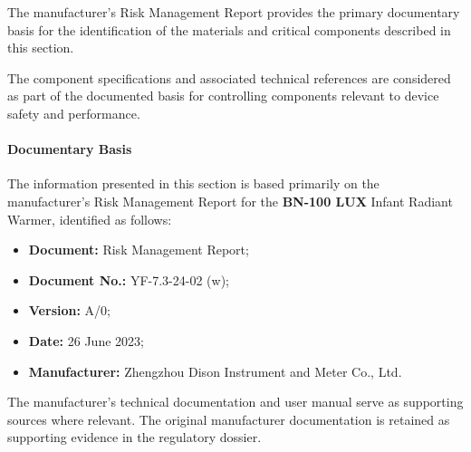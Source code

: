 The manufacturer's Risk Management Report provides the primary
documentary basis for the identification of the materials and
critical components described in this section.

The component specifications and associated technical references
are considered as part of the documented basis for controlling
components relevant to device safety and performance.

\paragraph{Documentary Basis}

The information presented in this section is based primarily on the
manufacturer's Risk Management Report for the
\textbf{BN-100 LUX} Infant Radiant Warmer, identified as follows:

\begin{itemize}
    \item \textbf{Document:} Risk Management Report;
    \item \textbf{Document No.:} YF-7.3-24-02 (w);
    \item \textbf{Version:} A/0;
    \item \textbf{Date:} 26 June 2023;
    \item \textbf{Manufacturer:} Zhengzhou Dison Instrument and Meter
    Co., Ltd.
\end{itemize}

The manufacturer's technical documentation and user manual serve
as supporting sources where relevant. The original manufacturer
documentation is retained as supporting evidence in the
regulatory dossier.

